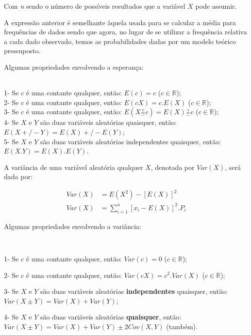\documentclass[
]{book}
\begin{document}
\hfill\break

Com \emph{n} sendo o número de possíveis resultados que a variável \(X\) pode assumir.

\hfill\break

A expressão anterior é semelhante àquela usada para se calcular a média para frequências de dados sendo que agora, no lugar de se utilizar a frequência relativa a cada dado observado, temos as probabilidades dadas por um modelo teórico pressuposto.

\hfill\break

Algumas propriedades envolvendo a esperança:

~\\
1- Se \(c\) é uma contante qualquer, então: \(E(c) = c\) (\(c \in \mathbb{R}\));\\
2- Se \(c\) é uma contante qualquer, então: \(E(c X) = c . E(X)\) (\(c \in \mathbb{R}\));\\
3- Se \(c\) é uma contante qualquer, então: \(E(X \frac{+}{-} c) = E(X) \frac{+}{-} c\) (\(c \in \mathbb{R}\));\\
4- Se \(X\) e \(Y\) são duas variáveis aleatórias quaisquer, então: \(E(X +/- Y) = E(X) +/- E(Y)\);\\
5- Se \(X\) e \(Y\) são duas variáveis aleatórias independentes quaisquer, então: \(E(X . Y) = E(X). E(Y)\).

\hfill\break

A variância de uma variável aleatória qualquer \(X\), denotada por \(Var(X)\), será dada por:

\hfill\break

\begin{align*}
Var\left(X\right) & = E(X^{2}) - [E(X)]^{2} \\
Var\left(X\right) & = \sum_{i=1}^{n} [{x}_{i} - E(X)]^{2}.{P}_{i} 
\end{align*}

\hfill\break

Algumas propriedades envolvendo a variância:

~

1- Se \(c\) é uma contante qualquer, então: \(Var(c)=0\) (\(c\in\mathbb{R}\));

2- Se \(c\) é uma contante qualquer, então: \(Var(cX)=c^{2}.Var(X)\) (\(c\in\mathbb{R}\));

3- Se \(X\) e \(Y\) são duas variáveis aleatórias \textbf{independentes} quaisquer, então: \(Var(X \pm Y)=Var(X)+Var(Y)\);

4- Se \(X\) e \(Y\) são duas variáveis aleatórias \textbf{quaisquer}, então: \(Var(X \pm Y)=Var(X)+Var(Y) \pm 2Cov(X,Y)\) (também).
\end{document}
